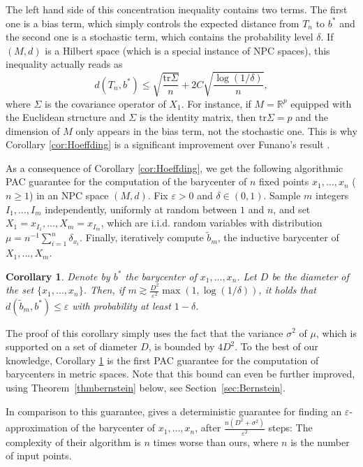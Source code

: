 \documentclass[10pt,a4paper]{article}
\theoremstyle{plain}
\newtheorem{corollary}[theorem]{Corollary}
\theoremstyle{definition}
\theoremstyle{remark}
\newcommand{\R}{\mathbb{R}}
\newcommand{\tr}{\mathrm{tr}}
\begin{document}
The left hand side of this concentration inequality contains two terms. The first one is a bias term, which simply controls the expected distance from $T_n$ to $b^*$ and the second one is a stochastic term, which contains the probability level $\delta$. If $(M,d)$ is a Hilbert space (which is a special instance of NPC spaces), this inequality actually reads as
$$d(T_n,b^*)\leq \sqrt{\frac{\tr \Sigma}{ n}}+2C\sqrt{\frac{\log(1/\delta)}{n}},$$
where $\Sigma$ is the covariance operator of $X_1$. For instance, if $M=\R^p$ equipped with the Euclidean structure and $\Sigma$ is the identity matrix, then $\tr \Sigma=p$ and the dimension of $M$ only appears in the bias term, not the stochastic one. This is why Corollary \ref{cor:Hoeffding} is a significant improvement over Funano's result \cite{Funano10}.


As a consequence of Corollary \ref{cor:Hoeffding}, we get the following algorithmic PAC guarantee for the computation of the barycenter of $n$ fixed points $x_1,\ldots,x_n$ ($n\geq 1$) in an NPC space $(M,d)$. Fix $\varepsilon>0$ and $\delta\in (0,1)$. Sample $m$ integers $I_1,\ldots,I_m$ independently, uniformly at random between $1$ and $n$, and set $X_1=x_{I_1}, \ldots, X_m=x_{I_m}$, which are i.i.d. random variables with distribution $\mu=n^{-1}\sum_{i=1}^n\delta_{x_i}$. Finally, iteratively compute $\tilde b_m$, the inductive barycenter of $X_1,\ldots,X_m$. 


\begin{corollary} \label{cor:algo}
    Denote by $b^*$ the barycenter of $x_1,\ldots,x_n$. Let $D$ be the diameter of the set $\{x_1,\ldots,x_n\}$. Then, if $m\gtrsim \frac{D^2}{\varepsilon^2}\max(1,\log(1/\delta))$, it holds that $d(\tilde b_m,b^*)\leq \varepsilon$ with probability at least $1-\delta$.
\end{corollary}


The proof of this corollary simply uses the fact that the variance $\sigma^2$ of $\mu$, which is supported on a set of diameter $D$, is bounded by $4D^2$. To the best of our knowledge, Corollary \ref{cor:algo} is the first PAC guarantee for the computation of barycenters in metric spaces. Note that this bound can even be further improved, using Theorem~\ref{thmbernstein} below, see Section~\ref{sec:Bernstein}.

In comparison to this guarantee, \cite[Theorem 3.4]{LimPalfia14} gives a deterministic guarantee for finding an $\varepsilon$-approximation of the barycenter of $x_1,\ldots,x_n$, after $\frac{n(D^2+\sigma^2)}{\varepsilon^2}$ steps: The complexity of their algorithm is $n$ times worse than ours, where $n$ is the number of input points.
\end{document}
